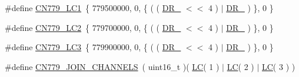 \begin{DoxyCompactItemize}
\#define \mbox{\hyperlink{group___r_e_g_i_o_n_c_n779_ga1318d698c85f15c35bd4953830d5df48}{C\+N779\+\_\+\+L\+C1}}~\{ 779500000, 0, \{ ( ( \mbox{\hyperlink{group___r_e_g_i_o_n_ga872e12c82020c02a7f70a1c6ed1375df}{D\+R\+\_}} $<$$<$ 4 ) $\vert$ \mbox{\hyperlink{group___r_e_g_i_o_n_ga6c4ef966b4f3d5eb7597b087f2b97095}{D\+R\+\_}} ) \}, 0 \}
\item 
\#define \mbox{\hyperlink{group___r_e_g_i_o_n_c_n779_ga758c5da7fe1372388ab9476835b4b4d2}{C\+N779\+\_\+\+L\+C2}}~\{ 779700000, 0, \{ ( ( \mbox{\hyperlink{group___r_e_g_i_o_n_ga872e12c82020c02a7f70a1c6ed1375df}{D\+R\+\_}} $<$$<$ 4 ) $\vert$ \mbox{\hyperlink{group___r_e_g_i_o_n_ga6c4ef966b4f3d5eb7597b087f2b97095}{D\+R\+\_}} ) \}, 0 \}
\item 
\#define \mbox{\hyperlink{group___r_e_g_i_o_n_c_n779_ga8e9d424722db59d84a7d122e95f3cce7}{C\+N779\+\_\+\+L\+C3}}~\{ 779900000, 0, \{ ( ( \mbox{\hyperlink{group___r_e_g_i_o_n_ga872e12c82020c02a7f70a1c6ed1375df}{D\+R\+\_}} $<$$<$ 4 ) $\vert$ \mbox{\hyperlink{group___r_e_g_i_o_n_ga6c4ef966b4f3d5eb7597b087f2b97095}{D\+R\+\_}} ) \}, 0 \}
\item 
\#define \mbox{\hyperlink{group___r_e_g_i_o_n_c_n779_gaad1a9c76c54bb1be159e6638c1aa768f}{C\+N779\+\_\+\+J\+O\+I\+N\+\_\+\+C\+H\+A\+N\+N\+E\+LS}}~( uint16\+\_\+t )( \mbox{\hyperlink{group___r_e_g_i_o_n_ga12fa17e5c1016e01a9d82c25027deb1b}{LC}}( 1 ) $\vert$ \mbox{\hyperlink{group___r_e_g_i_o_n_ga12fa17e5c1016e01a9d82c25027deb1b}{LC}}( 2 ) $\vert$ \mbox{\hyperlink{group___r_e_g_i_o_n_ga12fa17e5c1016e01a9d82c25027deb1b}{LC}}( 3 ) )
\end{DoxyCompactItemize}

